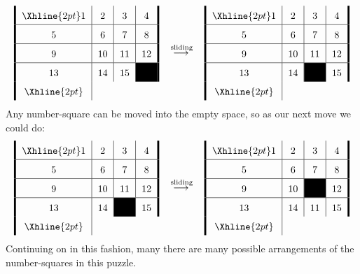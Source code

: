 \documentclass{ximera}
\begin{document}
\[
\arraycolsep=6pt\def\arraystretch{1.6}
\begin{array}{!{\vline width 2pt}c|c|c|c!{\vline width 2pt}}
    \Xhline{2pt}
    1  & 2  & 3  & 4 \\ \hline
    5  & 6  & 7  & 8 \\ \hline
    9  & 10 & 11 & 12 \\ \hline
    13 & 14 & 15 & \cellcolor{black}\\%
    \Xhline{2pt}
\end{array}\quad\lto^{\text{sliding}}\quad
\begin{array}{!{\vline width 2pt}c|c|c|c!{\vline width 2pt}}
    \Xhline{2pt}
    1  & 2  & 3  & 4 \\ \hline
    5  & 6  & 7  & 8 \\ \hline
    9  & 10 & 11 & 12 \\ \hline
    13 & 14 & \cellcolor{black} & 15 \\
    \Xhline{2pt}
\end{array}
\]
Any number-square can be moved into the empty space, so as our next
move we could do:
\[
\arraycolsep=6pt\def\arraystretch{1.6}
\begin{array}{!{\vline width 2pt}c|c|c|c!{\vline width 2pt}}
    \Xhline{2pt}
    1  & 2  & 3  & 4 \\ \hline
    5  & 6  & 7  & 8 \\ \hline
    9  & 10 & 11 & 12 \\ \hline
    13 & 14 & \cellcolor{black} & 15 \\
    \Xhline{2pt}
\end{array}\quad\lto^{\text{sliding}}\quad
\begin{array}{!{\vline width 2pt}c|c|c|c!{\vline width 2pt}}
    \Xhline{2pt}
    1  & 2  & 3  & 4 \\ \hline
    5  & 6  & 7  & 8 \\ \hline
    9  & 10 & \cellcolor{black} & 12 \\ \hline
    13 & 14 & 11 & 15 \\
    \Xhline{2pt}
\end{array}
\]
Continuing on in this fashion, many there are many possible
arrangements of the number-squares in this puzzle.
\end{document}
